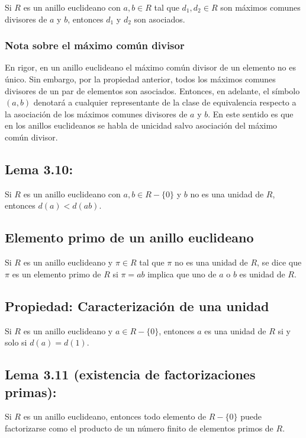 \documentclass{article}
\begin{document}
Si $R$ es un anillo euclideano con $a,b\in R$ tal que $d_1,d_2\in R$ son máximos comunes divisores de $a$ y $b$, entonces $d_1$ y $d_2$ son asociados.

\subsubsection*{\color{teal} Nota sobre el máximo común divisor}

En rigor, en un anillo euclideano el máximo común divisor de un elemento no es único. Sin embargo, por la propiedad anterior, todos los máximos comunes divisores de un par de elementos son asociados. Entonces, en adelante, el símbolo $(a,b)$ denotará a cualquier representante de la clase de equivalencia respecto a la asociación de los máximos comunes divisores de $a$ y $b$. En este sentido es que en los anillos euclideanos se habla de unicidad salvo asociación del máximo común divisor.

\subsection*{\color{blue} Lema 3.10:}

Si $R$ es un anillo euclideano con $a,b\in R-\{0\}$ y $b$ no es una unidad de $R$, entonces $d(a)<d(ab)$.

\subsection*{\color{violet} Elemento primo de un anillo euclideano}

Si $R$ es un anillo euclideano y $\pi\in R$ tal que $\pi$ no es una unidad de $R$, se dice que $\pi$ es un elemento primo de $R$ si $\pi=ab$ implica que uno de $a$ o $b$ es unidad de $R$.

\subsection*{\color{purple} Propiedad: Caracterización de una unidad}

Si $R$ es un anillo euclideano y $a\in R-\{0\}$, entonces $a$ es una unidad de $R$ si y solo si $d(a)=d(1)$.

\subsection*{\color{blue} Lema 3.11 (existencia de factorizaciones primas):}

Si $R$ es un anillo euclideano, entonces todo elemento de $R-\{0\}$ puede factorizarse como el producto de un número finito de elementos primos de $R$.
\end{document}

